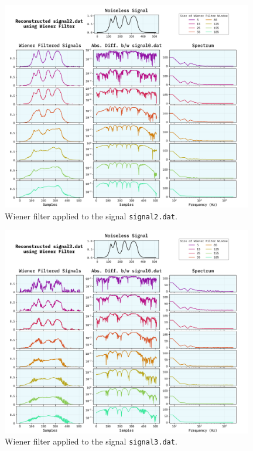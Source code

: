 \documentclass[10pt, titlepage, a4paper]{article}
\begin{document}
\begin{figure}[p]
    \centering
    \includegraphics[width=0.98\textwidth]{../WienerFilter/Images/reconstructed-signal2.dat.png}
    \caption{Wiener filter applied to the signal \texttt{signal2.dat}.}
    \label{fig:wiener-filter-2}
\end{figure}

\begin{figure}[p]
    \centering
    \includegraphics[width=0.98\textwidth]{../WienerFilter/Images/reconstructed-signal3.dat.png}
    \caption{Wiener filter applied to the signal \texttt{signal3.dat}.}
    \label{fig:wiener-filter-3}
\end{figure}
\end{document}
